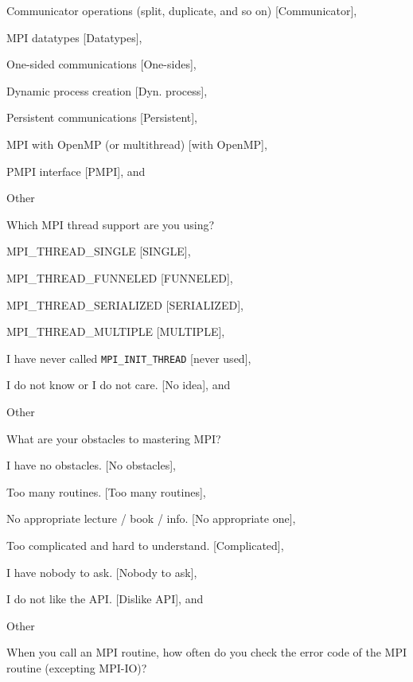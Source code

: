 \documentclass[preprint,5p,times]{elsarticle}
\begin{document}
{{\begin{description}[leftmargin=3mm]
\begin{inparaenum}[{\bf C}1)]
    \item Communicator operations (split, duplicate, and so on) [Communicator],
    \item MPI datatypes [Datatypes],
    \item One-sided communications [One-sides],
    \item Dynamic process creation [Dyn. process],
    \item Persistent communications [Persistent],
    \item MPI with OpenMP (or multithread) [with OpenMP],
    \item PMPI interface [PMPI], and
    \item Other
    \end{inparaenum}
  \item[Q18*:] Which MPI thread support are you using?
    \begin{inparaenum}[{\bf C}1)]
    \item MPI\_THREAD\_SINGLE [SINGLE],
    \item MPI\_THREAD\_FUNNELED [FUNNELED],
    \item MPI\_THREAD\_SERIALIZED [SERIALIZED],
    \item MPI\_THREAD\_MULTIPLE [MULTIPLE],
    \item I have never called {\tt MPI\_INIT\_THREAD} [never used],
    \item I do not know or I do not care. [No idea], and
    \item Other
    \end{inparaenum}
  \item[Q19*:] What are your obstacles to mastering MPI?
    \begin{inparaenum}[{\bf C}1)]
    \item I have no obstacles. [No obstacles],
    \item Too many routines. [Too many routines],
    \item No appropriate lecture / book / info. [No appropriate one],
    \item Too complicated and hard to understand. [Complicated],
    \item I have nobody to ask. [Nobody to ask],
    \item I do not like the API. [Dislike API], and
    \item Other
    \end{inparaenum}
  \item[Q20:] When you call an MPI routine, how often do you check the error code of the MPI routine  (excepting MPI-IO)?

\end{description}}}
\end{document}
